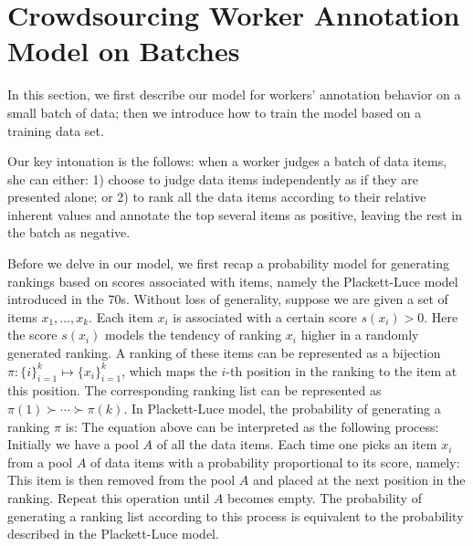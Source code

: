 \section{Crowdsourcing Worker Annotation Model on Batches}
\label{sec:worker}

In this section, we first describe our model for workers' annotation behavior on a small batch of data;
then we introduce how to train the model based on a training data set.

Our key intonation is the follows:
when a worker judges a batch of data items,
she can either: 
1) choose to judge data items independently as if they are presented alone; or 
2) to rank all the data items according to their relative inherent values
and annotate the top several items as positive, leaving the rest in the batch as negative.

%

Before we delve in our model, we first recap a probability model for generating rankings
based on scores associated with items, namely the Plackett-Luce model~\cite{luce:2005, plackett:1975} introduced in the 70s.
Without loss of generality, suppose we are given a set of items $x_1, \ldots, x_k$.
Each item $x_i$ is associated with a certain score $s(x_i) > 0$.  %
Here the score $s(x_i)$ models the tendency of ranking $x_i$ higher in a randomly generated ranking.  
A ranking of these items can be represented as a bijection $\pi : \{i\}_{i = 1}^k \mapsto \{x_i\}_{i = 1}^k$,
which maps the $i$-th position in the ranking to the item at this position.
The corresponding ranking list can be represented as
$\pi(1) \succ \cdots \succ \pi(k)$.
In Plackett-Luce model, the probability of generating a ranking $\pi$ is:
%
The equation above can be interpreted as the following process:
Initially we have a pool $A$ of all the data items.
Each time one picks an item $x_i$ from a pool $A$ of data items with a probability proportional to its score, namely:
This item is then removed from the pool $A$ and placed at the next position in the ranking.
Repeat this operation until $A$ becomes empty.
The probability of generating a ranking list according to this process is equivalent to the probability described in the Plackett-Luce model.

